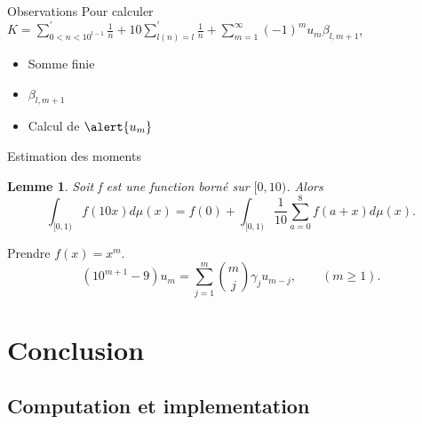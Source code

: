 \documentclass{beamer}
\newtheorem{lem}{Lemme}
\begin{document}
\begin{frame}{Observations}
	Pour calculer $K = \sum_{0<n<10^{l-1}}^{'}\frac{1}{n} + 10 \sum_{l(n)=l}^{'}
	\frac{1}{n} + \sum_{m=1}^{\infty}(-1)^{m}u_{m}\beta_{l, m+1}$,
	\begin{itemize}
		\item Somme finie
		\item $\beta_{l, m+1}$
		\item Calcul de $\alert{u_{m}}$ 
	\end{itemize}
\end{frame}

\begin{frame}{Estimation des moments}
	\begin{lem}
		Soit f est une function born\'e sur $[0, 10)$. Alors
		\[
			\int_{[0, 1)} f(10x) d\mu(x) = f(0) + \int_{[0, 1)} \frac{1}{10}
			\sum_{a=0}^{8} f(a+x) d\mu(x).
		\]
	\end{lem}
	Prendre $f(x) = x^{m}$.
	\[
		(10^{m+1}-9)u_{m} = \sum_{j=1}^{m}\binom{m}{j}\gamma_{j}u_{m-j}, \qquad
		(m \ge 1).
	\]
\end{frame}

\section{Conclusion}

\subsection{Computation et implementation}
\end{document}
